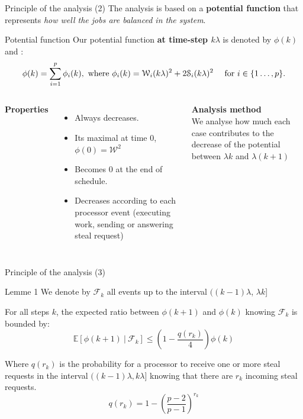 \documentclass{beamer}
\begin{document}
\begin{frame}{Principle of the analysis (2)}
    The analysis is based on a \textbf{potential function} that represents \textit{how well the jobs are balanced in the system}.
    \begin{block}{Potential function}
    Our potential function \textbf{at time-step \alert{$k\lambda$}} is denoted by $\phi(k)$ and : %
    \begin{equation*}
        \phi(k) = \sum_{i=1}^{p} \phi_i(k),  
        \text{ where $\phi_i(k) =
         \mathcal{W}_{i}(k\lambda)^{2} + 2\mathcal{S}_{i}(k\lambda)^{2}$ \quad for $i\in\{1\dots,p\}$}. 
    \end{equation*}
    \end{block}
    \begin{columns} 
    \textbf{Properties}
    \begin{itemize}
        \item Always decreases. 
        \item Its maximal at time 0, $\phi(0)= \mathcal{W}^2$
        \item Becomes $0$ at the end of schedule. 
        \item Decreases according to each processor event (executing work, sending or answering steal request) 
    \end{itemize}
    \textbf{Analysis method}\\

    \alert{ We analyse how much each case contributes to the decrease of the potential between \alert{$\lambda k$} and \alert{$\lambda(k+1)$}}
    \end{columns}
\end{frame}
\begin{frame}{Principle of the analysis (3)}

\begin{alertblock}{Lemme 1}
    We denote by $\mathcal{F}_{k}$ all events up to the interval $((k-1)\lambda$, $\lambda k$]

        For all steps $k$, the expected ratio between $\phi(k+1)$ and $\phi(k)$ knowing $\mathcal{F}_{k}$ is bounded by: 
        \begin{equation*}
            \mathbb{E}[\phi(k+1) \:|\: \mathcal{F}_{k}] \leq \left(1-\frac{q(r_k)}{4}\right)\phi(k) 
            \label{expdiff}
        \end{equation*}


        Where $q(r_k)$ is the probability for a processor to receive one
        or more steal requests in the interval $((k-1)\lambda,k\lambda]$ knowing that there are $r_k$ incoming steal requests.
        \begin{equation*}
            q(r_k) = 1 - \left(\frac{p-2}{p-1}\right)^{r_k}
            \label{expdiff}
        \end{equation*}
        
        \end{alertblock}
\end{frame}
\end{document}
